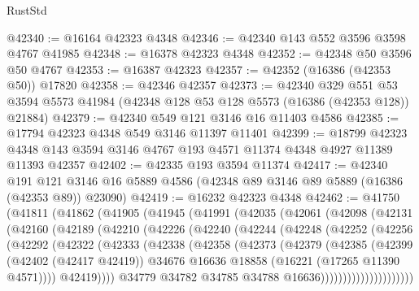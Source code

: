 \begin{lexlean}{RustStd}
\begin{coremodule}
@42340 := @16164 @42323 @4348
@42346 := @42340 @143 @552 @3596 @3598 @4767 @41985
@42348 := @16378 @42323 @4348
@42352 := @42348 @50 @3596 @50 @4767
@42353 := @16387 @42323
@42357 := @42352 (@16386 (@42353 @50)) @17820
@42358 := @42346 @42357
@42373 := @42340
    @329
    @551
    @53
    @3594
    @5573
    @41984
    (@42348 @128 @53 @128 @5573 (@16386 (@42353 @128)) @21884)
@42379 := @42340 @549 @121 @3146 @16 @11403 @4586
@42385 := @17794 @42323 @4348 @549 @3146 @11397 @11401
@42399 := @18799
    @42323
    @4348
    @143
    @3594
    @3146
    @4767
    @193
    @4571
    @11374
    @4348
    @4927
    @11389
    @11393
    @42357
@42402 := @42335 @193 @3594 @11374
@42417 := @42340
    @191
    @121
    @3146
    @16
    @5889
    @4586
    (@42348 @89 @3146 @89 @5889 (@16386 (@42353 @89)) @23090)
@42419 := @16232 @42323 @4348
@42462 := @41750
    (@41811
      (@41862
        (@41905
          (@41945
            (@41991
              (@42035
                (@42061
                  (@42098
                    (@42131
                      (@42160
                        (@42189
                          (@42210
                            (@42226
                              (@42240
                                (@42244
                                  (@42248
                                    (@42252
                                      (@42256
                                        (@42292
                                          (@42322
                                            (@42333
                                              (@42338
                                                (@42358
                                                  (@42373
                                                    (@42379
                                                      (@42385
                                                        (@42399
                                                          (@42402 (@42417 @42419))
                                                          @34676
                                                          @16636
                                                          @18858
                                                          (@16221 (@17265 @11390 @4571))))
                                                      @42419))))
                                              @34779
                                              @34782
                                              @34785
                                              @34788
                                              @16636)))))))))))))))))))))

\end{coremodule}
\end{lexlean}
